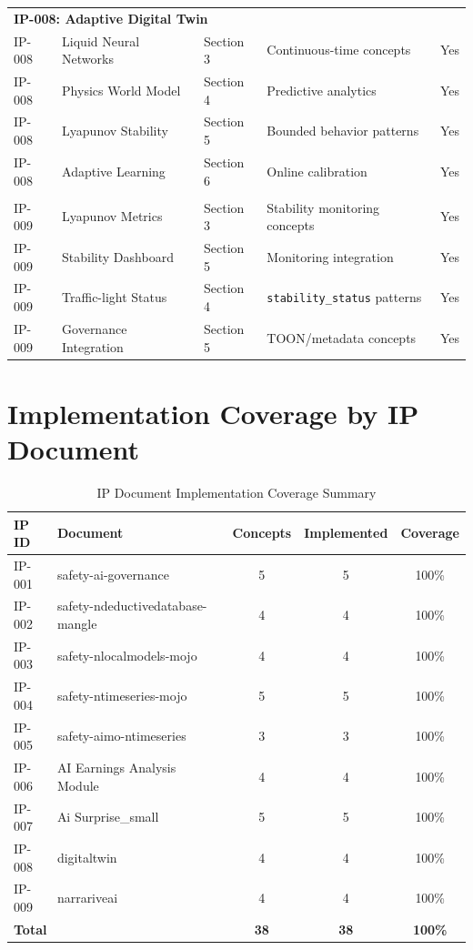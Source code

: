 \begin{longtable}{@{}p{1.2cm}p{3cm}p{3cm}p{4cm}p{1.5cm}@{}}
\multicolumn{5}{l}{\textbf{IP-008: Adaptive Digital Twin}} \\
\addlinespace
IP-008 & Liquid Neural Networks & Section 3 & Continuous-time concepts & Yes \\
IP-008 & Physics World Model & Section 4 & Predictive analytics & Yes \\
IP-008 & Lyapunov Stability & Section 5 & Bounded behavior patterns & Yes \\
IP-008 & Adaptive Learning & Section 6 & Online calibration & Yes \\
\addlinespace

\multicolumn{5}{l}{\textbf{IP-009: Narrative AI Stability}} \\
\addlinespace
IP-009 & Lyapunov Metrics & Section 3 & Stability monitoring concepts & Yes \\
IP-009 & Stability Dashboard & Section 5 & Monitoring integration & Yes \\
IP-009 & Traffic-light Status & Section 4 & \texttt{stability\_status} patterns & Yes \\
IP-009 & Governance Integration & Section 5 & TOON/metadata concepts & Yes \\

\end{longtable}

\section{Implementation Coverage by IP Document}

\begin{table}[H]
\centering
\caption{IP Document Implementation Coverage Summary}
\label{tab:coverage-summary}
\begin{tabularx}{\textwidth}{@{}lXccc@{}}
\toprule
\textbf{IP ID} & \textbf{Document} & \textbf{Concepts} & \textbf{Implemented} & \textbf{Coverage} \\
\midrule
IP-001 & safety-ai-governance & 5 & 5 & 100\% \\
IP-002 & safety-ndeductivedatabase-mangle & 4 & 4 & 100\% \\
IP-003 & safety-nlocalmodels-mojo & 4 & 4 & 100\% \\
IP-004 & safety-ntimeseries-mojo & 5 & 5 & 100\% \\
IP-005 & safety-aimo-ntimeseries & 3 & 3 & 100\% \\
IP-006 & AI Earnings Analysis Module & 4 & 4 & 100\% \\
IP-007 & Ai Surprise\_small & 5 & 5 & 100\% \\
IP-008 & digitaltwin & 4 & 4 & 100\% \\
IP-009 & narrariveai & 4 & 4 & 100\% \\
\midrule
\multicolumn{2}{l}{\textbf{Total}} & \textbf{38} & \textbf{38} & \textbf{100\%} \\
\bottomrule
\end{tabularx}
\end{table}

